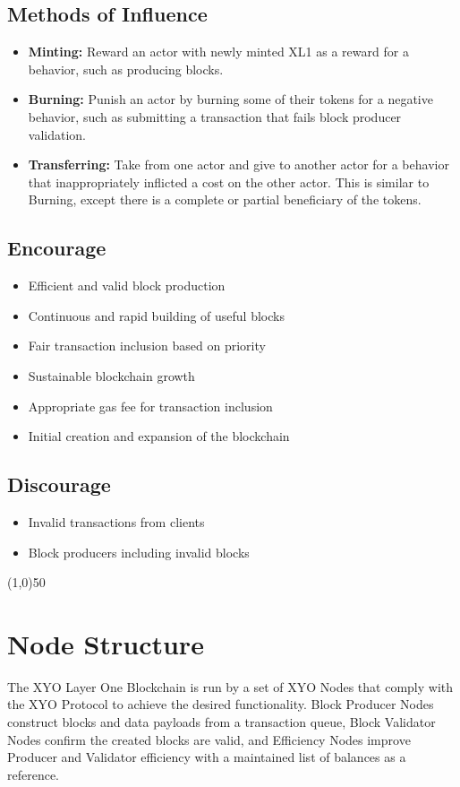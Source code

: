 \documentclass{article}
\begin{document}
\subsection{Methods of Influence}
\begin{itemize}
    \item \textbf{Minting:} Reward an actor with newly minted XL1 as a reward for a behavior, such as producing blocks. 
    \item \textbf{Burning:} Punish an actor by burning some of their tokens for a negative behavior, such as submitting a transaction that fails block producer validation. 
    \item \textbf{Transferring:} Take from one actor and give to another actor for a behavior that inappropriately inflicted a cost on the other actor. This is similar to Burning, except there is a complete or partial beneficiary of the tokens.
\end{itemize}

\subsection{Encourage}
\begin{itemize}
    \item Efficient and valid block production
    \item Continuous and rapid building of useful blocks
    \item Fair transaction inclusion based on priority
    \item Sustainable blockchain growth
    \item Appropriate gas fee for transaction inclusion
    \item Initial creation and expansion of the blockchain
\end{itemize}

\subsection{Discourage}
\begin{itemize}
    \item Invalid transactions from clients
    \item Block producers including invalid blocks
\end{itemize}

\begin{center}
    \line(1,0){50}
\end{center}

\section{Node Structure}
The XYO Layer One Blockchain is run by a set of XYO Nodes that comply with the XYO Protocol to achieve the desired functionality. Block Producer Nodes construct blocks and data payloads from a transaction queue, Block Validator Nodes confirm the created blocks are valid, and Efficiency Nodes improve Producer and Validator efficiency with a maintained list of balances as a reference. 
\end{document}

